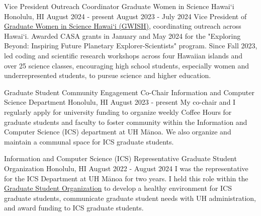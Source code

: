 \vspace{-3mm}
\begin{cventries}
\vspace{3mm}

\cventry
{Vice President \newline Outreach Coordinator}
{Graduate Women in Science Hawai`i}
{Honolulu, HI}
{August 2024 - present \newline
August 2023 - July 2024}
{
    Vice President of \href{https://www.gwishawaii.org/}{Graduate Women in Science Hawai`i (GWISH)}, coordinating outreach across Hawai`i. Awarded CASA grants in January and May 2024 for the "Exploring Beyond: Inspiring Future Planetary Explorer-Scientists" program. Since Fall 2023, led coding and scientific research workshops across four Hawaiian islands and over 25 science classes, encouraging high school students, especially women and underrepresented students, to pursue science and higher education.
}

\vspace{1mm}

\cventry
{Graduate Student Community Engagement Co-Chair}
{Information and Computer Science Department}
{Honolulu, HI}
{August 2023 - present}
{
    My co-chair and I regularly apply for university funding to organize weekly Coffee Hours for graduate students and faculty to foster community within the Information and Computer Science (ICS) department at UH Mānoa. We also organize and maintain a communal space for ICS graduate students.
}

\vspace{1mm}

\cventry
{Information and Computer Science (ICS) Representative}
{Graduate Student Organization}
{Honolulu, HI}
{August 2022 - August 2024}
{
    I was the representative for the ICS Department at UH Mānoa for two years. I held this role within the \href{https://manoa.hawaii.edu/graduate/graduate-student-organization/}{Graduate Student Organization} to develop a healthy environment for ICS graduate students, communicate graduate student needs with UH administration, and award funding to ICS graduate students.
}

\vspace{1mm}

\end{cventries}

\vspace{-4mm}
